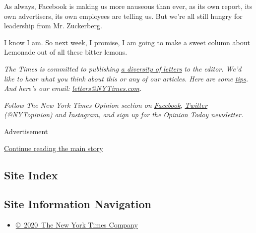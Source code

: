 As always, Facebook is making us more nauseous than ever, as its own
report, its own advertisers, its own employees are telling us. But we're
all still hungry for leadership from Mr. Zuckerberg.

I know I am. So next week, I promise, I am going to make a sweet column
about Lemonade out of all these bitter lemons.

\emph{The Times is committed to publishing}
\href{https://www.nytimes3xbfgragh.onion/2019/01/31/opinion/letters/letters-to-editor-new-york-times-women.html}{\emph{a
diversity of letters}} \emph{to the editor. We'd like to hear what you
think about this or any of our articles. Here are some}
\href{https://help.nytimes3xbfgragh.onion/hc/en-us/articles/115014925288-How-to-submit-a-letter-to-the-editor}{\emph{tips}}\emph{.
And here's our email:}
\href{mailto:letters@NYTimes.com}{\emph{letters@NYTimes.com}}\emph{.}

\emph{Follow The New York Times Opinion section on}
\href{https://www.facebookcorewwwi.onion/nytopinion}{\emph{Facebook}}\emph{,}
\href{http://twitter.com/NYTOpinion}{\emph{Twitter (@NYTopinion)}}
\emph{and}
\href{https://www.instagram.com/nytopinion/}{\emph{Instagram}}\emph{,
and sign up for the}
\href{http://www.nytimes3xbfgragh.onion/newsletters/opiniontoday/}{\emph{Opinion
Today newsletter}}\emph{.}

Advertisement

\protect\hyperlink{after-bottom}{Continue reading the main story}

\hypertarget{site-index}{%
\subsection{Site Index}\label{site-index}}

\hypertarget{site-information-navigation}{%
\subsection{Site Information
Navigation}\label{site-information-navigation}}

\begin{itemize}
\tightlist
\item
  \href{https://help.nytimes3xbfgragh.onion/hc/en-us/articles/115014792127-Copyright-notice}{©~2020~The
  New York Times Company}
\end{itemize}

